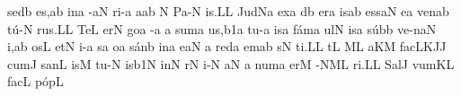 \spatium
\sgn sed\punctum b\egn
\sgn {}e{s,}\punctum a\augmentum b\egn
\spatium
\divisiominor
\spatium
\sgn {}in\punctum a\egn
\spatium
{}-\clivis aN\egn
\sgn ri-\punctum a\egn
\sgn {}a{}\pes ab\egn
\spatium
\custos N
\lineaproxima
\spatium
\sgn Pa-\bivirga N\egn
{}i{s.}\punctum L\augmentum L\egn
\spatium
\divisiofinalis
\spatium
\sgn Jud\pes Na\egn
\sgn {}ex\punctum a\egn
\spatium
{}d\punctum b\egn
\sgn {}er\punctum a\egn
\sgn {}is\punctum a\augmentum b\egn
\spatium
\divisiominima
\spatium
\sgn {}e{ss}\clivis aN\egn
\sgn {}e{}\punctum a\egn
\spatium
\sgn ven\pes ab\egn
\sgn t{\'u}-\bivirga N\egn
\sgn ru{s.}\punctum L\augmentum L\egn
\spatium
\divisiofinalis
\spatium
\sgn Te{}\punctum L\egn
\spatium
\sgn {}er\punctum N\egn
\sgn go{}\punctum a\egn
\spatium
{}-\punctum a\egn
\custos a
\lineaproxima
\sgn sum\punctum a\egn
\sgn {}u{s,}\episem b1\punctum a\egn
\spatium
\sgn tu-\punctum a\egn
\sgn {}is\punctum a\egn
\spatium
\sgn f{\'a}m\punctum a\egn
\sgn {}ul\punctum N\egn
\sgn {}is\punctum a\egn
\spatium
\sgn s{\'u}b\punctum b\egn
\sgn ve{-n}\clivis aN\egn
\sgn {}i,\punctum a\augmentum b\egn
\spatium
\divisiominor
\spatium
{}os\punctum L\egn
\spatium
{}et\punctum N\egn
\sgn {}i-\punctum a\egn
{}s\punctum a\egn
\sgn {}o{}\punctum a\egn
\spatium
\sgn s{\'a}n\punctum b\egn
{}in\punctum a\egn
\sgn {}e{}\clivis aN\egn
\spatium
\custos a
\lineaproxima
\sgn red\punctum a\egn
\sgn {}em\pes ab\egn
\sgn {}{\'\i}s\bivirga N\egn
\sgn ti.\punctum L\augmentum L\egn
\spatium
\divisiofinalis
\spatium
\sgn {}{\AE}t\punctum L\egn
{}\clivis ML\egn
\sgn {}a{}\pes KM\egn
\spatium
\sgn fac\climacus LKJ\augmentum J\egn
\spatium
\divisiominor
\spatium
\sgn cum\punctum J\egn
\spatium
\sgn san\punctum L\egn
{}is\punctum M\egn
\spatium
\sgn tu-\punctum N\egn
\sgn {}is\episem b1\punctum N\egn
\spatium
\divisiominima
\spatium
\sgn {}in\punctum N\egn
\spatium
{}r\punctum N\egn
\sgn {}i-\punctum N\egn
\sgn {}a{}\punctum N\egn
\spatium
\custos a
\lineaproxima
\sgn num\punctum a\egn
\sgn {}er\punctum M\egn
{}-\climacus NML\egn
\sgn ri.\punctum L\augmentum L\egn
\spatium
\divisiofinalis
\spatium
\sgn Sal\punctum J\egn
\sgn vum\pes KL\egn
\spatium
\sgn fac\punctum L\egn
\spatium
\sgn p{\'o}p\punctum L\egn
